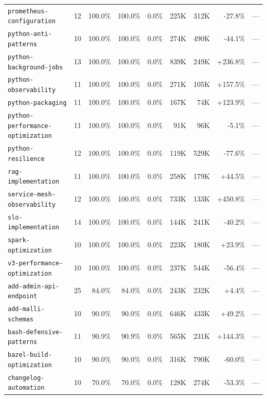 \documentclass{article}
\begin{document}
\begin{table}[t]
{\begin{tabular}{l c r r r r r r r}
  \texttt{prometheus-configuration} & 12 & 100.0\% & 100.0\% & 0.0\% & 225K & 312K & \cellcolor{green!10}-27.8\% & --- \\
  \texttt{python-anti-patterns} & 10 & 100.0\% & 100.0\% & 0.0\% & 274K & 490K & \cellcolor{green!10}-44.1\% & --- \\
  \texttt{python-background-jobs} & 13 & 100.0\% & 100.0\% & 0.0\% & 839K & 249K & \cellcolor{red!10}+236.8\% & --- \\
  \texttt{python-observability} & 11 & 100.0\% & 100.0\% & 0.0\% & 271K & 105K & \cellcolor{red!10}+157.5\% & --- \\
  \texttt{python-packaging} & 11 & 100.0\% & 100.0\% & 0.0\% & 167K & 74K & \cellcolor{red!10}+123.9\% & --- \\
  \texttt{python-performance-optimization} & 11 & 100.0\% & 100.0\% & 0.0\% & 91K & 96K & \cellcolor{green!10}-5.1\% & --- \\
  \texttt{python-resilience} & 12 & 100.0\% & 100.0\% & 0.0\% & 119K & 529K & \cellcolor{green!10}-77.6\% & --- \\
  \texttt{rag-implementation} & 11 & 100.0\% & 100.0\% & 0.0\% & 258K & 179K & \cellcolor{red!10}+44.5\% & --- \\
  \texttt{service-mesh-observability} & 12 & 100.0\% & 100.0\% & 0.0\% & 733K & 133K & \cellcolor{red!10}+450.8\% & --- \\
  \texttt{slo-implementation} & 14 & 100.0\% & 100.0\% & 0.0\% & 144K & 241K & \cellcolor{green!10}-40.2\% & --- \\
  \texttt{spark-optimization} & 10 & 100.0\% & 100.0\% & 0.0\% & 223K & 180K & \cellcolor{red!10}+23.9\% & --- \\
  \texttt{v3-performance-optimization} & 10 & 100.0\% & 100.0\% & 0.0\% & 237K & 544K & \cellcolor{green!10}-56.4\% & --- \\
\midrule
  \texttt{add-admin-api-endpoint} & 25 & 84.0\% & 84.0\% & 0.0\% & 243K & 232K & +4.4\% & --- \\
  \texttt{add-malli-schemas} & 10 & 90.0\% & 90.0\% & 0.0\% & 646K & 433K & \cellcolor{red!10}+49.2\% & --- \\
  \texttt{bash-defensive-patterns} & 11 & 90.9\% & 90.9\% & 0.0\% & 565K & 231K & \cellcolor{red!10}+144.3\% & --- \\
  \texttt{bazel-build-optimization} & 10 & 90.0\% & 90.0\% & 0.0\% & 316K & 790K & \cellcolor{green!10}-60.0\% & --- \\
  \texttt{changelog-automation} & 10 & 70.0\% & 70.0\% & 0.0\% & 128K & 274K & \cellcolor{green!10}-53.3\% & --- \\

\end{tabular}}
\end{table}
\end{document}
